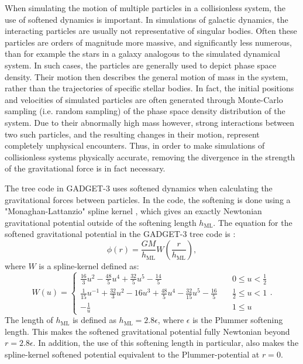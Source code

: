 \documentclass[english, twoside]{HYgradu}
\begin{document}
When simulating the motion of multiple particles in a collisionless system, the use of softened dynamics is important. In simulations of galactic dynamics, the interacting particles are usually not representative of singular bodies. Often these particles are orders of magnitude more massive, and significantly less numerous, than for example the stars in a galaxy analogous to the simulated dynamical system. In such cases, the particles are generally used to depict phase space density. Their motion then describes the general motion of mass in the system, rather than the trajectories of specific stellar bodies. In fact, the initial positions and velocities of simulated particles are often generated through Monte-Carlo sampling (i.e. random sampling) of the phase space density distribution of the system. Due to their abnormally high mass however, strong interactions between two such particles, and the resulting changes in their motion, represent completely unphysical encounters. Thus, in order to make simulations of collisionless systems physically accurate, removing the divergence in the strength of the gravitational force is in fact necessary.

The tree code in GADGET-3 uses softened dynamics when calculating the gravitational forces between particles. In the code, the softening is done using a "Monaghan-Lattanzio" spline kernel \citep{Monaghan1985}, which gives an exactly Newtonian gravitational potential outside of the softening length $h_\mathrm{ML}$. The equation for the softened gravitational potential in the GADGET-3 tree code is \citep{Springel2001}:
\begin{equation}
\phi(r) = \frac{GM}{h_\mathrm{ML}} W \left(\frac{r}{h_\mathrm{ML}} \right), \label{eq:splinekernel_softened_potential}
\end{equation}
where $W$ is a spline-kernel defined as:
\begin{equation}
W(u) = 
\begin{cases}
\frac{16}{3}u^2 - \frac{48}{5} u^4 + \frac{32}{5} u^5 - \frac{14}{5} &\quad 0 \leq u < \frac{1}{2} \\
\frac{1}{15}u^{-1} + \frac{32}{3}u^2 - 16u^3 + \frac{48}{5} u^4 - \frac{32}{15} u^5 - \frac{16}{5} &\quad \frac{1}{2} \leq u < 1 \\
-\frac{1}{u} &\quad  1 \leq u
\end{cases}.
\end{equation} 
The length of $h_\mathrm{ML}$ is defined as $h_\mathrm{ML} = 2.8\epsilon$, where $\epsilon$ is the Plummer softening length. This makes the softened gravitational potential fully Newtonian beyond $r = 2.8 \epsilon$. In addition, the use of this softening length in particular, also makes the spline-kernel softened potential equivalent to the Plummer-potential at $r = 0$.
\end{document}
